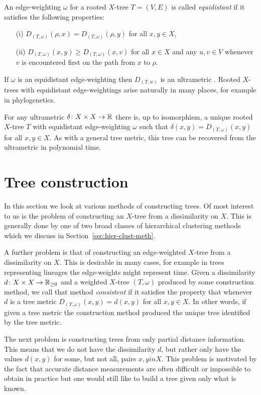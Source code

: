 An edge-weighting $\omega$ for a rooted $X$-tree $T=(V,E)$ is called
\textit{equidistant} if it satisfies the following properties:
\begin{itemize}
\item[(i)] $D_{(T,\omega)}(\rho,x) = D_{(T,\omega)}(\rho,y)$ for all $x,y \in X$,
\item[(ii)] $D_{(T,\omega)}(x,y) \geq D_{(T,\omega)}(x,v)$ for all $x \in X$
  and any $u,v \in V$ whenever $v$ is encountered first on the path from $x$
  to $\rho$.
\end{itemize}
If $\omega$ is an equidistant edge-weighting then $D_{(T,w)}$ is an
ultrametric \citep{semple2003phylogenetics}.  Rooted $X$-trees with
equidistant edge-weightings arise naturally in many places, for example in
phylogenetics.

For any ultrametric $\delta \colon X \times X \to {\mathbb R}$ there is, up to
isomorphism, a unique rooted $X$-tree $T$ with equidistant edge-weighting
$\omega$ such that $\delta(x,y) = D_{(T,\omega)}(x,y)$ for all $x,y \in X$.
As with a general tree metric, this tree can be recovered from the ultrametric
in polynomial time.

\section{Tree construction}
\label{sec:tree-construction}

In this section we look at various methods of constructing trees.  Of most
interest to us is the problem of constructing an $X$-tree from a dissimilarity
on $X$.  This is generally done by one of two broad classes of hierarchical
clustering methods which we discuss in Section~\ref{sec:hier-clust-meth}.

A further problem is that of constructing an edge-weighted $X$-tree from a
dissimilarity on $X$.  This is desirable in many cases, for example in trees
representing lineages the edge-weights might represent time.  Given a
dissimilarity $d \colon X \times X \to {\mathbb R}_{\geq 0}$ and a weighted $X$-tree
$(T,\omega)$ produced by some construction method, we call that method
\textit{consistent} if it satisfies the property that whenever $d$ is a tree
metric $D_{(T,\omega)}(x,y) = d(x,y)$ for all $x,y \in X$.  In other words, if
given a tree metric the construction method produced the unique tree
identified by the tree metric.

The next problem is constructing trees from only partial distance information.
This means that we do not have the dissimilarity $d$, but rather only have the
values $d(x,y)$ for some, but not all, pairs $x,y in X$.  This problem is
motivated by the fact that accurate distance measurements are often difficult
or impossible to obtain in practice but one would still like to build a tree
given only what is known.

